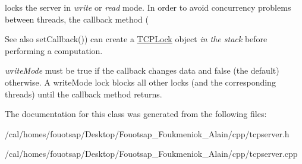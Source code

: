 locks the server in {\itshape write} or {\itshape read} mode. In order to avoid concurrency problems between threads, the callback method ( 

\begin{DoxySeeAlso}{See also}
set\+Callback()) can create a \hyperlink{classcppu_1_1_t_c_p_lock}{T\+C\+P\+Lock} object {\itshape in the stack} before performing a computation.
\end{DoxySeeAlso}
{\itshape write\+Mode} must be true if the callback changes data and false (the default) otherwise. A write\+Mode lock blocks all other locks (and the corresponding threads) until the callback method returns. 

The documentation for this class was generated from the following files\+:\begin{DoxyCompactItemize}
\item 
/cal/homes/fouotsap/\+Desktop/\+Fouotsap\+\_\+\+Foukmeniok\+\_\+\+Alain/cpp/tcpserver.\+h\item 
/cal/homes/fouotsap/\+Desktop/\+Fouotsap\+\_\+\+Foukmeniok\+\_\+\+Alain/cpp/tcpserver.\+cpp\end{DoxyCompactItemize}
